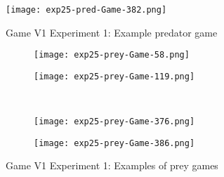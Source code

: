 \begin{figure}
  \centering
  \texttt{[image: exp25-pred-Game-382.png]}
  \caption{Game V1 Experiment 1: Example predator game}
  \label{fig:exp1-pred-game-58}
\end{figure}

\begin{figure}
  \centering
  \begin{subfigure}{.4\textwidth}
  \texttt{[image: exp25-prey-Game-58.png]}
  \end{subfigure}
  \begin{subfigure}{.4\textwidth}
  \texttt{[image: exp25-prey-Game-119.png]}
  \end{subfigure} \\\hfill
  
  \begin{subfigure}{.4\textwidth}
   \texttt{[image: exp25-prey-Game-376.png]}  
   \end{subfigure}
   \begin{subfigure}{.4\textwidth}
   \texttt{[image: exp25-prey-Game-386.png]}
   \end{subfigure}
  \caption{Game V1 Experiment 1: Examples of prey games \label{fig:exp1-prey-example-games}}
  
\end{figure}

